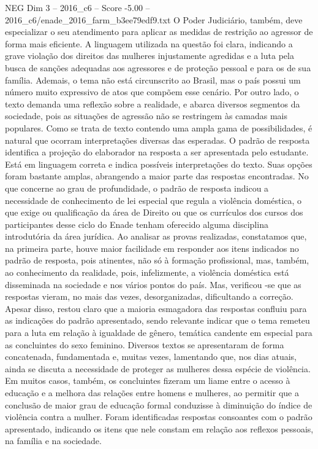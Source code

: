 \begin{textsample}{NEG Dim 3 – 2016\_c6 – Score -5.00 – 2016\_c6/enade\_2016\_farm\_b3ee79edf9.txt}
O Poder Judiciário, também, deve especializar o seu atendimento para aplicar as medidas de restrição ao agressor de forma mais eficiente.
A linguagem utilizada na questão foi clara, indicando a grave violação dos direitos das mulheres injustamente agredidas e a luta pela busca de sanções adequadas aos agressores e de proteção pessoal e para os de sua família.
Ademais, o tema não está circunscrito ao Brasil, mas o país possui um número muito expressivo de atos que compõem esse cenário.
Por outro lado, o texto demanda uma reflexão sobre a realidade, e abarca diversos segmentos da sociedade, pois as situações de agressão não se restringem às camadas mais populares.
Como se trata de texto contendo uma ampla gama de possibilidades, é natural que ocorram interpretações diversas das esperadas.
O padrão de resposta identifica a projeção do elaborador na resposta a ser apresentada pelo estudante.
Está em linguagem correta e indica possíveis interpretações do texto.
Suas opções foram bastante amplas, abrangendo a maior parte das respostas encontradas.
No que concerne ao grau de profundidade, o padrão de resposta indicou a necessidade de conhecimento de lei especial que regula a violência doméstica, o que exige ou qualificação da área de Direito ou que os currículos dos cursos dos participantes desse ciclo do Enade tenham oferecido alguma disciplina introdutória da área jurídica.
Ao analisar as provas realizadas, constatamos que, na primeira parte, houve maior facilidade em responder aos itens indicados no padrão de resposta, pois atinentes, não só à formação profissional, mas, também, ao conhecimento da realidade, pois, infelizmente, a violência doméstica está disseminada na sociedade e nos vários pontos do país.
Mas, verificou -se que as respostas vieram, no mais das vezes, desorganizadas, dificultando a correção.
Apesar disso, restou claro que a maioria esmagadora das respostas confluiu para as indicações do padrão apresentado, sendo relevante indicar que o tema remeteu para a luta em relação à igualdade de gênero, temática candente em especial para as concluintes do sexo feminino.
Diversos textos se apresentaram de forma concatenada, fundamentada e, muitas vezes, lamentando que, nos dias atuais, ainda se discuta a necessidade de proteger as mulheres dessa espécie de violência.
Em muitos casos, também, os concluintes fizeram um liame entre o acesso à educação e a melhora das relações entre homens e mulheres, ao permitir que a conclusão de maior grau de educação formal conduzisse à diminuição do índice de violência contra a mulher.
Foram identificadas respostas consoantes com o padrão apresentado, indicando os itens que nele constam em relação aos reflexos pessoais, na família e na sociedade.

\end{textsample}
